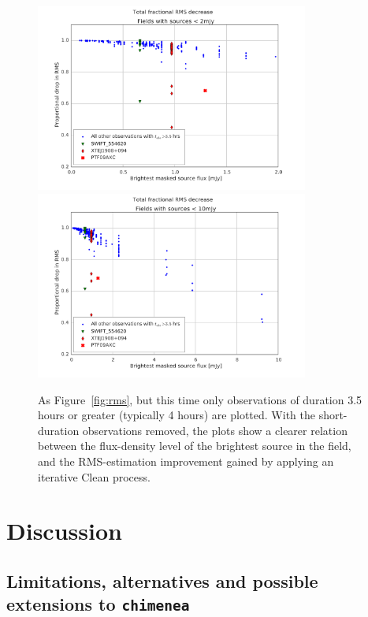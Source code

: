 \documentclass[5p,authoryear]{elsarticle}
\begin{document}
\begin{figure}[p]
\begin{center}  
  \includegraphics[width=0.8\textwidth]{../figures/rms_to_2mjy_4hrs}
  \includegraphics[width=0.8\textwidth]{../figures/rms_to_10mjy_4hrs}
  \caption[Fractional RMS decrease vs. brightest source flux for long-duration observations]{%
  \label{fig:rms_long_duration}
  As Figure~\ref{fig:rms}, but this time only observations of duration 3.5 hours or greater (typically 4 hours) are plotted. 
  With the short-duration observations removed, the plots show a clearer relation between the flux-density level of the brightest source in the field, and the RMS-estimation improvement gained by applying an iterative Clean process.
} 
\end{center} 
\end{figure}


\section{Discussion}
\label{sec:discussion}
\subsection{Limitations, alternatives and possible extensions to \texttt{chimenea}}
\label{sec:chimenea-discussion}
\end{document}

